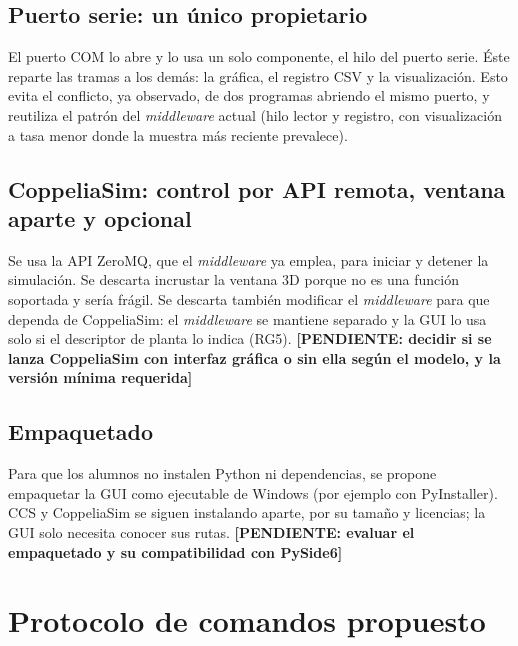 \documentclass[12pt,letterpaper]{article}
\newcommand{\pendiente}[1]{\textbf{[PENDIENTE: #1]}}
\begin{document}
\subsection{Puerto serie: un único propietario}

El puerto COM lo abre y lo usa un solo componente, el hilo del puerto serie. Éste reparte las tramas a los demás: la gráfica, el registro CSV y la visualización. Esto evita el conflicto, ya observado, de dos programas abriendo el mismo puerto, y reutiliza el patrón del \textit{middleware} actual (hilo lector y registro, con visualización a tasa menor donde la muestra más reciente prevalece).

\subsection{CoppeliaSim: control por API remota, ventana aparte y opcional}

Se usa la API ZeroMQ, que el \textit{middleware} ya emplea, para iniciar y detener la simulación. Se descarta incrustar la ventana 3D porque no es una función soportada y sería frágil. Se descarta también modificar el \textit{middleware} para que dependa de CoppeliaSim: el \textit{middleware} se mantiene separado y la GUI lo usa solo si el descriptor de planta lo indica (RG5). \pendiente{decidir si se lanza CoppeliaSim con interfaz gráfica o sin ella según el modelo, y la versión mínima requerida}

\subsection{Empaquetado}

Para que los alumnos no instalen Python ni dependencias, se propone empaquetar la GUI como ejecutable de Windows (por ejemplo con PyInstaller). CCS y CoppeliaSim se siguen instalando aparte, por su tamaño y licencias; la GUI solo necesita conocer sus rutas. \pendiente{evaluar el empaquetado y su compatibilidad con PySide6}

\section{Protocolo de comandos propuesto}
\label{sec:protocolo}
\end{document}
